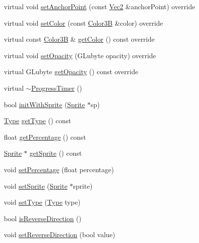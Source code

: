 \begin{DoxyCompactItemize}
\item 
virtual void \hyperlink{classProgressTimer_a2d83a3a9d2aa6a7d949a3800c82dfc68}{set\+Anchor\+Point} (const \hyperlink{classVec2}{Vec2} \&anchor\+Point) override
\item 
virtual void \hyperlink{classProgressTimer_aabc06a02c225d876ac5746dc6561949f}{set\+Color} (const \hyperlink{structColor3B}{Color3B} \&color) override
\item 
virtual const \hyperlink{structColor3B}{Color3B} \& \hyperlink{classProgressTimer_acf6cb8de15ca3e8954c05a64adec8402}{get\+Color} () const override
\item 
virtual void \hyperlink{classProgressTimer_a9f36a7fde3a6490b81e53f23ebbd3df9}{set\+Opacity} (G\+Lubyte opacity) override
\item 
virtual G\+Lubyte \hyperlink{classProgressTimer_ae9f8f93b5849d34fce2fa84ffec463c1}{get\+Opacity} () const override
\item 
virtual \hyperlink{classProgressTimer_a95ee08f7c26113454f87421f45c641b0}{$\sim$\+Progress\+Timer} ()
\item 
bool \hyperlink{classProgressTimer_afa1640086b67814db77d3ae725c18b45}{init\+With\+Sprite} (\hyperlink{classSprite}{Sprite} $\ast$sp)
\item 
\hyperlink{classProgressTimer_a9638d092b86d51bce727621b1a70d32f}{Type} \hyperlink{classProgressTimer_a322177b2b80d358482270730ba811cbd}{get\+Type} () const
\item 
float \hyperlink{classProgressTimer_a446b52a689c8ea0f556f3c1b12eda7b8}{get\+Percentage} () const
\item 
\hyperlink{classSprite}{Sprite} $\ast$ \hyperlink{classProgressTimer_abf78b31860b22109143633f44508233f}{get\+Sprite} () const
\item 
void \hyperlink{classProgressTimer_a13901defa20b543b0d92bbf043215945}{set\+Percentage} (float percentage)
\item 
void \hyperlink{classProgressTimer_a3910e7c59c07732edcc2039dacbe7172}{set\+Sprite} (\hyperlink{classSprite}{Sprite} $\ast$sprite)
\item 
void \hyperlink{classProgressTimer_abe2478baf4201427691e7bd615151c19}{set\+Type} (\hyperlink{classProgressTimer_a9638d092b86d51bce727621b1a70d32f}{Type} type)
\item 
bool \hyperlink{classProgressTimer_a97b759861d5e2e32ff94833f23e24eb7}{is\+Reverse\+Direction} ()
\item 
void \hyperlink{classProgressTimer_a1bfa9056523c014a8453caf962a1e69c}{set\+Reverse\+Direction} (bool value)

\end{DoxyCompactItemize}
